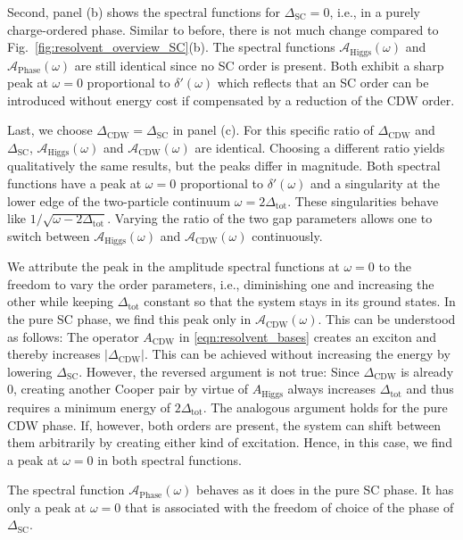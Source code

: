 \documentclass[
    reprint, 
    aps,
    preprintnumbers,
    twocolumn,
    prb,
    superscriptaddress
]{revtex4-2}
\newcommand{\spectral}[1]{\mathcal{A}_\text{#1}  (\omega)}
\begin{document}
Second, panel (b) shows the spectral functions for $\Delta_\text{SC} = 0$, i.e., in a purely charge-ordered phase.
Similar to before, there is not much change compared to Fig.\ \ref{fig:resolvent_overview_SC}(b).
The spectral functions $\spectral{Higgs}$ and $\spectral{Phase}$ are still identical since no
SC order is present. Both exhibit a sharp peak at $\omega=0$ proportional to $\delta'(\omega)$
which reflects that an SC order can be introduced without energy cost if compensated by a reduction of the CDW order.

Last, we choose $\Delta_\text{CDW} = \Delta_\text{SC}$ in panel (c).
For this specific ratio of $\Delta_\text{CDW}$ and $\Delta_\text{SC}$, 
$\spectral{Higgs}$ and $\spectral{CDW}$ are identical.
Choosing a different ratio yields qualitatively the same results, but the peaks differ in magnitude.
Both spectral functions have a peak at $\omega = 0$ proportional to $\delta'(\omega)$
and a singularity at the lower edge of the two-particle continuum $\omega = 2\Delta_\text{tot}$.
These singularities behave like $1/\sqrt{\omega - 2 \Delta_\text{tot}}$.
Varying the ratio of the two gap parameters allows one to
switch between $\spectral{Higgs}$ and $\spectral{CDW}$ continuously.

We attribute the peak in the amplitude spectral functions at $\omega=0$ 
to the freedom to vary the order parameters, i.e., 
diminishing one and increasing the other while keeping $\Delta_\text{tot}$ 
constant so that the system stays in its ground states. 
In the pure SC phase, we find this peak only in $\spectral{CDW}$.
This can be understood as follows: The operator $A_\text{CDW}$ in \eqref{eqn:resolvent_bases} 
creates an exciton and thereby increases $|\Delta_\text{CDW}|$.
This can be achieved without increasing the energy by lowering $\Delta_\text{SC}$.
However, the reversed argument is not true: Since $\Delta_\text{CDW}$ is already 0, 
creating another Cooper pair by virtue of $A_\text{Higgs}$ always increases $\Delta_\text{tot}$ and thus 
requires a minimum energy of $2 \Delta_\text{tot}$.
The analogous argument holds for the pure CDW phase.
If, however, both orders are present, the system can shift between them arbitrarily 
by creating either kind of excitation.
Hence, in this case, we find a peak at $\omega=0$ in both spectral functions.

The spectral function $\spectral{Phase}$ behaves as it does in the pure SC phase. 
It has only a peak at $\omega = 0$ that is associated with the freedom of choice
of the phase of $\Delta_\text{SC}$.
\end{document}
